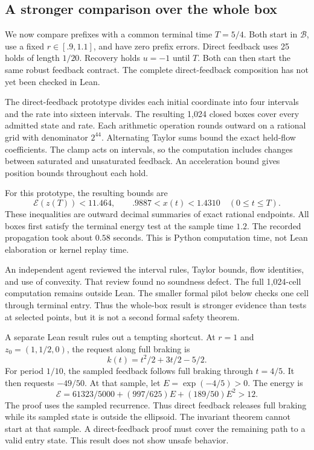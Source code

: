 \documentclass[10pt]{article}
\newcommand{\E}{\mathcal E}
\begin{document}
\subsection{A stronger comparison over the whole box}
We now compare prefixes with a common terminal time $T=5/4$. Both start in $\mathcal B$, use a fixed $r\in[.9,1.1]$, and have zero prefix errors. Direct feedback uses 25 holds of length $1/20$. Recovery holds $u=-1$ until $T$. Both can then start the same robust feedback contract. The complete direct-feedback composition has not yet been checked in Lean.

The direct-feedback prototype divides each initial coordinate into four intervals and the rate into sixteen intervals. The resulting 1,024 closed boxes cover every admitted state and rate. Each arithmetic operation rounds outward on a rational grid with denominator $2^{44}$. Alternating Taylor sums bound the exact held-flow coefficients. The clamp acts on intervals, so the computation includes changes between saturated and unsaturated feedback. An acceleration bound gives position bounds throughout each hold.

For this prototype, the resulting bounds are
\[
\E(z(T))<11.464,\qquad .9887<x(t)<1.4310\quad(0\le t\le T).
\]
These inequalities are outward decimal summaries of exact rational endpoints. All boxes first satisfy the terminal energy test at the sample time $1.2$. The recorded propagation took about $0.58$ seconds. This is Python computation time, not Lean elaboration or kernel replay time.

An independent agent reviewed the interval rules, Taylor bounds, flow identities, and use of convexity. That review found no soundness defect. The full 1,024-cell computation remains outside Lean. The smaller formal pilot below checks one cell through terminal entry. Thus the whole-box result is stronger evidence than tests at selected points, but it is not a second formal safety theorem.

A separate Lean result rules out a tempting shortcut. At $r=1$ and $z_0=(1,1/2,0)$, the request along full braking is
\[
k(t)=t^2/2+3t/2-5/2.
\]
For period $1/10$, the sampled feedback follows full braking through $t=4/5$. It then requests $-49/50$. At that sample, let $E=\exp(-4/5)>0$. The energy is
\[
\E=61323/5000+(997/625)E+(189/50)E^2>12.
\]
The proof uses the sampled recurrence. Thus direct feedback releases full braking while its sampled state is outside the ellipsoid. The invariant theorem cannot start at that sample. A direct-feedback proof must cover the remaining path to a valid entry state. This result does not show unsafe behavior.
\end{document}
